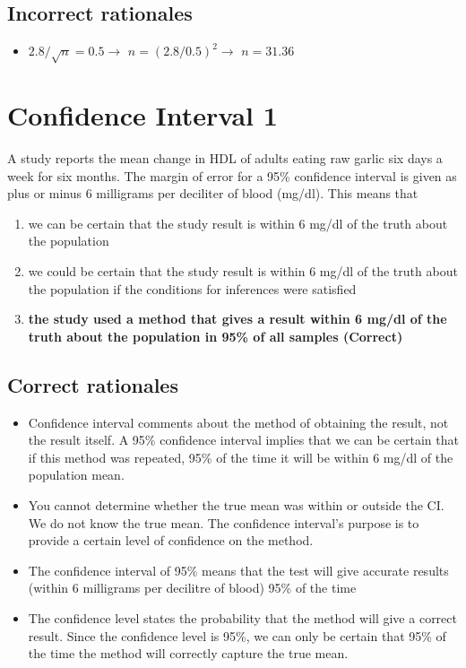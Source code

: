 \documentclass[letterpaper,12pt,twoside,printwatermark=false]{pinp}
\providecommand{\tightlist}{%
  \setlength{\itemsep}{0pt}\setlength{\parskip}{0pt}}
\begin{document}
\hypertarget{incorrect-rationales-1}{%
\subsection{Incorrect rationales}\label{incorrect-rationales-1}}

\begin{itemize}
\tightlist
\item
  \(2.8/\sqrt{n}=0.5 \to\) \(n=(2.8/0.5)^2 \to\) \(n=31.36\)
\end{itemize}

\hypertarget{confidence-interval-1}{%
\section{Confidence Interval 1}\label{confidence-interval-1}}

A study reports the mean change in HDL of adults eating raw garlic six
days a week for six months. The margin of error for a 95\% confidence
interval is given as plus or minus 6 milligrams per deciliter of blood
(mg/dl). This means that

\begin{enumerate}
\def\labelenumi{\alph{enumi}.}
\tightlist
\item
  we can be certain that the study result is within 6 mg/dl of the truth
  about the population
\item
  we could be certain that the study result is within 6 mg/dl of the
  truth about the population if the conditions for inferences were
  satisfied
\item
  \textbf{the study used a method that gives a result within 6 mg/dl of
  the truth about the population in 95\% of all samples (Correct)}
\end{enumerate}

\hypertarget{correct-rationales-2}{%
\subsection{Correct rationales}\label{correct-rationales-2}}

\begin{itemize}
\tightlist
\item
  Confidence interval comments about the method of obtaining the result,
  not the result itself. A 95\% confidence interval implies that we can
  be certain that if this method was repeated, 95\% of the time it will
  be within 6 mg/dl of the population mean.
\item
  You cannot determine whether the true mean was within or outside the
  CI. We do not know the true mean. The confidence interval's purpose is
  to provide a certain level of confidence on the method.
\item
  The confidence interval of 95\% means that the test will give accurate
  results (within 6 milligrams per decilitre of blood) 95\% of the time
\item
  The confidence level states the probability that the method will give
  a correct result. Since the confidence level is 95\%, we can only be
  certain that 95\% of the time the method will correctly capture the
  true mean.
\end{itemize}
\end{document}
